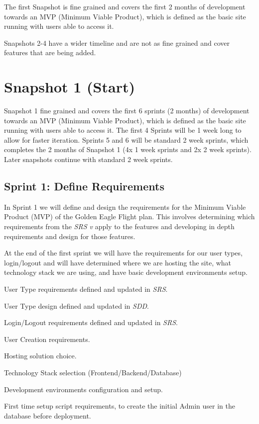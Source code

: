 The first Snapshot is fine grained and covers the first 2 months of development towards an MVP (Minimum Viable Product), which is defined as the basic site running with users able to access it.

Snapshots 2-4 have a wider timeline and are not as fine grained and cover features that are being added.


\newpage %
\section{Snapshot 1 (Start)}
Snapshot 1 fine grained and covers the first 6 sprints (2 months) of development towards an MVP (Minimum Viable Product), which is defined as the basic site running with users able to access it.
The first 4 Sprints will be 1 week long to allow for faster iteration.
Sprints 5 and 6 will be standard 2 week sprints, which completes the 2 months of Snapshot 1 (4x 1 week sprints and 2x 2 week sprints). Later snapshots continue with standard 2 week sprints.

\subsection {Sprint 1: Define Requirements}
In Sprint 1 we will define and design the requirements for the Minimum Viable Product (MVP) of the Golden Eagle Flight plan.
This involves determining which requirements from the \emph{SRS v\currentVersion} apply to the features and developing in depth requirements and design for those features.


At the end of the first sprint we will have the requirements for our user types, login/logout and will have determined where we are hosting the site, what technology stack we are using, and have basic development environments setup.

	\begin{todolist}[leftmargin=3\parindent]
		\item User Type requirements defined and updated in \emph{SRS}.
		\item User Type design defined and updated in \emph{SDD}.
		\item Login/Logout requirements defined and updated in \emph{SRS}.
		\item User Creation requirements.
		\item Hosting solution choice.
		\item Technology Stack selection (Frontend/Backend/Database)
		\item Development environments configuration and setup.	
		\item First time setup script requirements, to create the initial Admin user in the database before deployment.
	\end{todolist}

